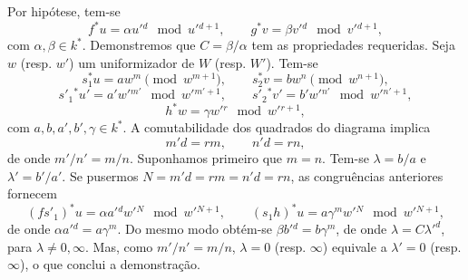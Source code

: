 Por hipótese, tem-se
\[
f^*u=\alpha u'{}^d\mod{u'{}^{d+1}},\qquad
g^*v=\beta v'{}^d\mod{v'{}^{d+1}},
\]
com $\alpha,\beta\in k^*$. Demonstremos que $C=\beta/\alpha$ tem as propriedades requeridas. Seja $w$ (resp. $w'$) um uniformizador de $W$ (resp. $W'$). Tem-se
\[
s_1^*u=aw^m\pmod {w^{m+1}},\qquad
s_2^*v=bw^n\pmod {w^{n+1}},
\]
\[
s'_1{}^*u'=a'w'{}^{m'}\mod{w'{}^{m'+1}},\qquad
s'_2{}^*v'=b'w'{}^{n'}\mod{w'{}^{n'+1}},
\]
\[
h^*w=\gamma w'{}^r\mod{w'{}^{r+1}},
\]
com $a,b,a',b',\gamma\in k^*$. A comutabilidade dos quadrados do diagrama implica
\[
m'd=rm,\qquad n'd=rn,
\]
de onde $m'/n'=m/n$. Suponhamos primeiro que $m=n$. Tem-se $\lambda=b/a$ e $\lambda'=b'/a'$. Se pusermos $N=m'd=rm=n'd=rn$, as congruências anteriores fornecem
\[
(fs'_1)^*u=\alpha a'{}^d w'{}^N\mod{w'{}^{N+1}},\qquad
(s_1h)^*u=a\gamma^m w'{}^N\mod{w'{}^{N+1}},
\]
de onde $\alpha a'{}^d=a\gamma^m$. Do mesmo modo obtém-se $\beta b'{}^d=b\gamma^m$, de onde $\lambda=C{\lambda'}^d$, para $\lambda\ne 0,\infty$. Mas, como $m'/n'=m/n$, $\lambda=0$ (resp. $\infty$) equivale a $\lambda'=0$ (resp. $\infty$), o que conclui a demonstração.
